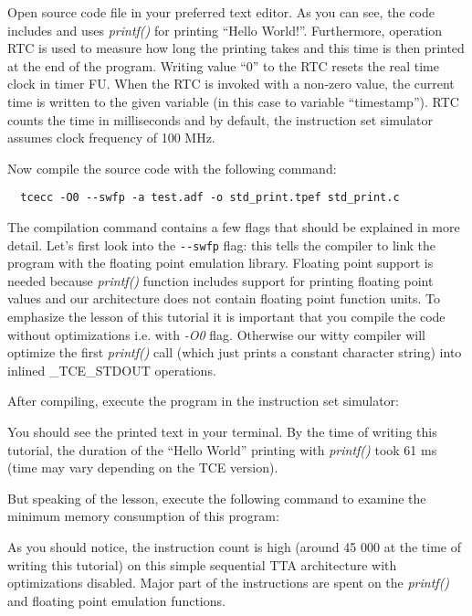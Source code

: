 \documentclass[twoside]{tceusermanual}
\begin{document}
Open source code file  in your preferred text
editor. As you can see, the code includes  and uses
\textit{printf()} for printing ``Hello World!''. Furthermore,
operation RTC is used to measure how long the printing takes and this
time is then printed at the end of the program. Writing value ``0'' to
the RTC resets the real time clock in timer FU. When the RTC is
invoked with a non-zero value, the current time is written to the
given variable (in this case to variable ``timestamp''). RTC counts
the time in milliseconds and by default, the instruction set simulator
assumes clock frequency of 100 MHz.

Now compile the source code with the following command:

\begin{verbatim}
  tcecc -O0 --swfp -a test.adf -o std_print.tpef std_print.c
\end{verbatim}

The compilation command contains a few flags that should be explained
in more detail. Let's first look into the \verb|--swfp| flag: this
tells the compiler to link the program with the floating point
emulation library. Floating point support is needed because
\textit{printf()} function includes support for printing floating
point values and our architecture does not contain floating point
function units. To emphasize the lesson of this tutorial it is
important that you compile the code without optimizations i.e. with
\textit{-O0} flag. Otherwise our witty compiler will optimize the
first \textit{printf()} call (which just prints a constant character
string) into inlined \_TCE\_STDOUT operations.

After compiling, execute the program in the instruction set simulator:


You should see the printed text in your terminal. By the time of
writing this tutorial, the duration of the ``Hello World'' printing
with \textit{printf()} took 61 ms (time may vary depending on the TCE
version).

But speaking of the lesson, execute the following command to examine
the minimum memory consumption of this program:


As you should notice, the instruction count is high (around 45 000 at
the time of writing this tutorial) on this simple sequential TTA
architecture with optimizations disabled. Major part of the
instructions are spent on the \textit{printf()} and floating point
emulation functions.
\end{document}
